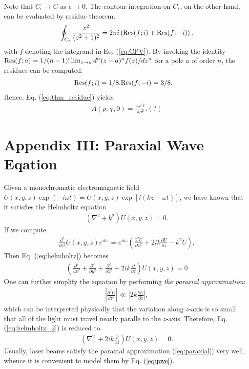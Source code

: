 Note that $C_{\epsilon} \rightarrow C$ as $\epsilon \rightarrow 0$. The contour integration on $C_{\epsilon}$, on the other hand, can be evaluated by residue theorem.
\begin{eqnarray}
	\oint_{C_{\epsilon}} \frac{z^2}{(z^2 + 1)^2} = 2\pi i \left( {\rm Res}(f; i) + {\rm Res}(f; -i) \right),
	\label{eq:thm_residue}
\end{eqnarray}
with $f$ denoting the integrand in Eq. (\ref{eq:CPV}). By invoking the identity ${\rm Res}(f; a) = 1/(n-1)! \lim_{z \rightarrow a} d^n (z - a)^n f(z) /dz^n$ for a pole $a$ of order $n$, the residues can be computed:
\begin{eqnarray}
	{\rm Res}(f; i) = 1/8, & {\rm Res}(f; -i) = 3/8.
	\nonumber
\end{eqnarray}
Hence, Eq. (\ref{eq:thm_residue}) yields
\begin{eqnarray}
	A(\rho, \chi, 0) = \frac{- e^{i \chi}}{\pi \rho^2}. (?)
\end{eqnarray}

\section*{Appendix III: Paraxial Wave Eqation}
Given a monochromatic electromagnetic field $\tilde{U}(x, y, z) \exp(-i \omega t) = U(x, y, z)\exp[i (kz - \omega t)]$, we have known that it satisfies the Helmholtz equation
\begin{eqnarray}
	\left(\nabla^2 + k^2\right) \tilde{U}(x, y, z) = 0.
	\label{eq:helmholtz}
\end{eqnarray}
If we compute
\begin{eqnarray}
	\frac{\partial^2}{\partial z^2} U(x, y, z)e^{ikz} = e^{ikz}
	\left( \frac{\partial^2 U}{\partial z^2} + 2ik \frac{\partial U}{\partial z} - k^2 U \right),
	\nonumber
\end{eqnarray}
Then Eq. (\ref{eq:helmholtz}) becomes
\begin{eqnarray}
	\left(\frac{\partial^2}{\partial x^2} + \frac{\partial^2}{\partial y^2} + \frac{\partial^2}{\partial z^2} + 2ik \frac{\partial}{\partial z} \right) U(x, y, z) = 0
	\label{eq:helmholtz_2}
\end{eqnarray}
One can further simplify the equation by performing {\em the paraxial approximation}:
\begin{eqnarray}
	\left| \frac{\partial^2 U}{\partial z^2} \right| \ll \left| 2k \frac{\partial U}{\partial z} \right|,
	\label{eq:paraxial}
\end{eqnarray}
which can be interpreted physically that the variation along $z$-axis is so small that all of the light must travel nearly paralle to the $z$-axis. Therefore, Eq. (\ref{eq:helmholtz_2}) is reduced to
\begin{eqnarray}
	\left(\nabla_{\perp}^2 + 2ik \frac{\partial}{\partial z} \right) U(x, y, z) = 0.
	\label{eq:pwe}
\end{eqnarray}
Usually, laser beams satisfy the paraxial approximation (\ref{eq:paraxial}) very well, whence it is convenient to model them by Eq. (\ref{eq:pwe}).

